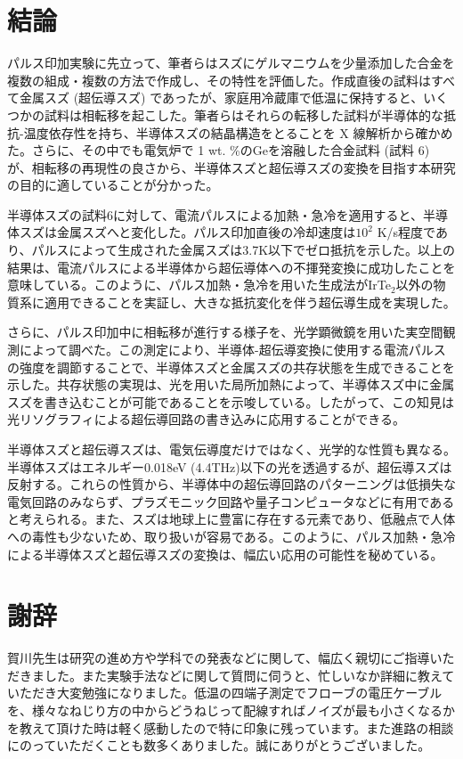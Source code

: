 \section{結論}
パルス印加実験に先立って、筆者らはスズにゲルマニウムを少量添加した合金を複数の組成・複数の方法で作成し、その特性を評価した。作成直後の試料はすべて金属スズ (超伝導スズ) であったが、家庭用冷蔵庫で低温に保持すると、いくつかの試料は相転移を起こした。筆者らはそれらの転移した試料が半導体的な抵抗-温度依存性を持ち、半導体スズの結晶構造をとることを X 線解析から確かめた。さらに、その中でも電気炉で 1 wt. \%のGeを溶融した合金試料 (試料 6) が、相転移の再現性の良さから、半導体スズと超伝導スズの変換を目指す本研究の目的に適していることが分かった。

半導体スズの試料6に対して、電流パルスによる加熱・急冷を適用すると、半導体スズは金属スズへと変化した。パルス印加直後の冷却速度は$10^2$ K/s程度であり、パルスによって生成された金属スズは3.7K以下でゼロ抵抗を示した。以上の結果は、電流パルスによる半導体から超伝導体への不揮発変換に成功したことを意味している。このように、パルス加熱・急冷を用いた生成法がIrTe$_2$以外の物質系に適用できることを実証し、大きな抵抗変化を伴う超伝導生成を実現した。

さらに、パルス印加中に相転移が進行する様子を、光学顕微鏡を用いた実空間観測によって調べた。この測定により、半導体-超伝導変換に使用する電流パルスの強度を調節することで、半導体スズと金属スズの共存状態を生成できることを示した。共存状態の実現は、光を用いた局所加熱によって、半導体スズ中に金属スズを書き込むことが可能であることを示唆している。したがって、この知見は光リソグラフィによる超伝導回路の書き込みに応用することができる。

半導体スズと超伝導スズは、電気伝導度だけではなく、光学的な性質も異なる。半導体スズはエネルギー0.018eV (4.4THz)以下の光を透過するが、超伝導スズは反射する。これらの性質から、半導体中の超伝導回路のパターニングは低損失な電気回路のみならず、プラズモニック回路や量子コンピュータなどに有用であると考えられる。また、スズは地球上に豊富に存在する元素であり、低融点で人体への毒性も少ないため、取り扱いが容易である。このように、パルス加熱・急冷による半導体スズと超伝導スズの変換は、幅広い応用の可能性を秘めている。
\clearpage

\section*{謝辞}
賀川先生は研究の進め方や学科での発表などに関して、幅広く親切にご指導いただきました。また実験手法などに関して質問に伺うと、忙しいなか詳細に教えていただき大変勉強になりました。低温の四端子測定でフローブの電圧ケーブルを、様々なねじり方の中からどうねじって配線すればノイズが最も小さくなるかを教えて頂けた時は軽く感動したので特に印象に残っています。また進路の相談にのっていただくことも数多くありました。誠にありがとうございました。

